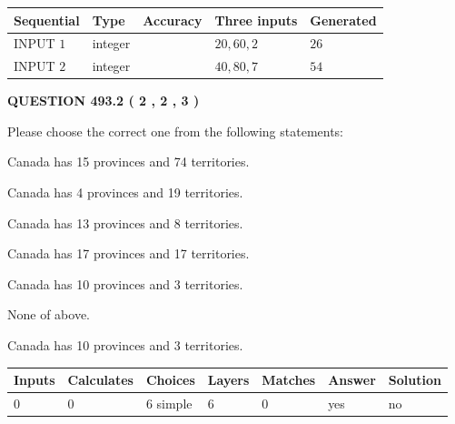 \documentclass[12pt]{article}
\begin{document}
   
  
  
\noindent\begin{tabular}{|l|l|l|l|l|}
\hline
 Sequential & Type & Accuracy & Three inputs & Generated \\ 
\hline
 
 
  INPUT $  1 $ & integer &  & $
 20
 , 
 60
 , 
 2
 $ & $ 26 $ 
 \\  \hline  
 
 
  INPUT $  2 $ & integer &  & $
 40
 , 
 80
 , 
 7
 $ & $ 54 $ 
 \\  \hline  
 \end{tabular}
   
   
  
\vspace{0.2in}
  
{\textbf{\Large{QUESTION
493.2 
 ( 2 , 2 , 3 )
}}}
  
  
Please choose the correct one from the following statements:
 
 
Canada has  15 provinces and  74 territories.
 
 
Canada has   4 provinces and  19 territories.
 
 
Canada has  13 provinces and  8 territories.
 
 
Canada has  17 provinces and  17 territories.
 
 
Canada has 10  provinces and 3 territories.
 
 
 None of above.
 
 
\noindent{}
 
 
Canada has 10  provinces and 3 territories.
 
 
\noindent{}
 
 
   
   
   
   
\noindent\begin{tabular}{|l|l|l|l|l|l|l|}
 \hline
Inputs & Calculates & Choices & Layers & Matches & Answer & Solution \\ \hline
 0  & 
 0  & 
 6
  simple  
  & 
 6  & 
 0  & 
  yes & 
  no 
  \\ \hline
 \end{tabular}
   
\end{document}
